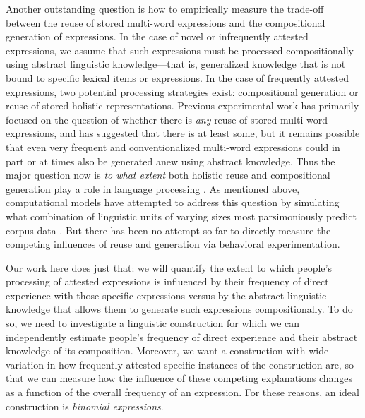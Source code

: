 \documentclass[authoryear]{elsarticle}
\begin{document}
	Another outstanding question is how to empirically measure the trade-off between the reuse of stored multi-word expressions and the compositional generation of expressions. In the case of novel or infrequently attested expressions, we assume that such expressions must be processed compositionally using abstract linguistic knowledge---that is, generalized knowledge that is not bound to specific lexical items or expressions. In the case of frequently attested expressions, two potential processing strategies exist: compositional generation or reuse of stored holistic representations. Previous experimental work has primarily focused on the question of whether there is \emph{any} reuse of stored multi-word expressions, and has suggested that there is at least some, but it remains possible that even very frequent and conventionalized multi-word expressions could in part or at times also be generated anew using abstract knowledge. Thus the major question now is \emph{to what extent} both holistic reuse and compositional generation play a role in language processing \citep{Wiechmann:2013hr}. As mentioned above, computational models have attempted to address this question by simulating what combination of linguistic units of varying sizes most parsimoniously predict corpus data \citep{Bod:2003uw, ODonnell:2011vh, Post:2013hh}. But there has been no attempt so far to directly measure the competing influences of reuse and generation via behavioral experimentation.

Our work here does just that: we will quantify the extent to which people's processing of attested expressions is influenced by their frequency of direct experience with those specific expressions versus by the abstract linguistic knowledge that allows them to generate such expressions compositionally. To do so, we need to investigate a linguistic construction for which we can independently estimate people's frequency of direct experience and their abstract knowledge of its composition. Moreover, we want a construction with wide variation in how frequently attested specific instances of the construction are, so that we can measure how the influence of these competing explanations changes as a function of the overall frequency of an expression. For these reasons, an ideal construction is \emph{binomial expressions}.
	
\end{document}
